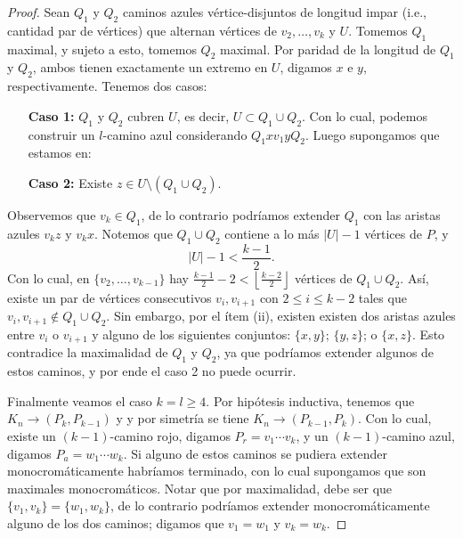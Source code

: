 \documentclass[12pt]{report}
\theoremstyle{plain}
\theoremstyle{definition}
\newcommand{\abs}[1]{\left \vert #1 \right \vert}
\newcommand{\floor}[1]{\left\lfloor #1  \right\rfloor}
\begin{document}
\begin{proof}
Sean $Q_1$ y $Q_2$ caminos azules vértice-disjuntos de longitud impar (i.e., cantidad par de vértices) que alternan vértices de $v_2, \ldots, v_k$ y $U$. Tomemos $Q_1$ maximal, y sujeto a esto, tomemos $Q_2$ maximal. Por paridad de la longitud de $Q_1$ y $Q_2$, ambos tienen exactamente un extremo en $U$, digamos $x$ e $y$, respectivamente. Tenemos dos casos:
\begin{enumerate}
\item[\textbf{Caso 1:}] $Q_1$ y $Q_2$ cubren $U$, es decir, $U \subset Q_1 \cup Q_2$. Con lo cual, podemos construir un $l$-camino azul considerando $Q_1 x v_1 y Q_2$. Luego supongamos que estamos en:
\item[\textbf{Caso 2:}] Existe $z \in U \setminus ( Q_1 \cup Q_2)$.
\end{enumerate}

Observemos que $v_k \in Q_1$, de lo contrario podríamos extender $Q_1$ con las aristas azules $v_k z$ y $v_k x$. Notemos que $Q_1 \cup Q_2$ contiene a lo más $\abs{U} -1$ vértices de $P$, y
\[
    \abs U  - 1 < \frac{k-1}{2}.
\]
Con lo cual, en $\{v_2, \ldots, v_{k-1}\}$ hay $\frac{k-1}{2} - 2 < \floor{\frac{k-2}{2}}$ vértices de $Q_1 \cup Q_2$. Así, existe un par de vértices consecutivos $v_{i}, v_{i+1}$ con $2 \leq i \leq k-2$ tales que $v_i , v_{i+1} \not \in Q_1 \cup Q_2$. Sin embargo, por el ítem (ii), existen existen dos aristas azules entre $v_i$ o $v_{i+1}$ y alguno de los siguientes conjuntos: $\{x,y\}$; $\{y,z\}$; o $\{x,z\}$. Esto contradice la maximalidad de $Q_1$ y $Q_2$, ya que podríamos extender algunos de estos caminos, y por ende el caso 2 no puede ocurrir.

\bigskip


Finalmente veamos el caso $k = l \geq 4$. Por hipótesis inductiva, tenemos que $K_n \longrightarrow (P_k, P_{k-1})$ y y por simetría se tiene $K_n \longrightarrow (P_{k-1}, P_k)$. Con lo cual, existe un $(k-1)$-camino rojo, digamos $P_r = v_1 \cdots v_k$, y un $(k-1)$-camino azul, digamos $P_a = w_1 \cdots w_k$. Si alguno de estos caminos se pudiera extender monocromáticamente habríamos terminado, con lo cual supongamos que son maximales monocromáticos. Notar que por maximalidad, debe ser que $\{v_1 , v_k\} = \{w_1, w_k\}$, de lo contrario podríamos extender monocromáticamente alguno de los dos caminos; digamos que $v_1 = w_1$ y $v_k = w_k$.


\end{proof}
\end{document}
